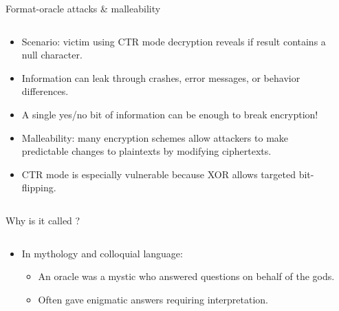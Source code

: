 \documentclass[aspectratio=169, lualatex, handout]{beamer}
\begin{document}
\begin{frame}{Format-oracle attacks \& malleability}
	\begin{columns}[c]
		\begin{column}{0.6\textwidth}
			\begin{itemize}[<+->]
				\item Scenario: victim using CTR mode decryption reveals if result contains a null character.
				\item Information can leak through crashes, error messages, or behavior differences.
				\item A single yes/no bit of information can be enough to break encryption!
				\item Malleability: many encryption schemes allow attackers to make predictable changes to plaintexts by modifying ciphertexts.
				\item CTR mode is especially vulnerable because XOR allows targeted bit-flipping.
			\end{itemize}
		\end{column}
		\begin{column}{0.4\textwidth}
		\end{column}
	\end{columns}
\end{frame}

\begin{frame}{Why is it called ?}
	\begin{columns}[c]
		\begin{column}{0.5\textwidth}
			\begin{itemize}
				\item In mythology and colloquial language:
				      \begin{itemize}
					      \item An oracle was a mystic who answered questions on behalf of the gods.
					      \item Often gave enigmatic answers requiring interpretation.
				      \end{itemize}
			\end{itemize}
		\end{column}
		\begin{column}{0.5\textwidth}
			\vspace{-0.4cm}
		\end{column}
	\end{columns}
\end{frame}
\end{document}

